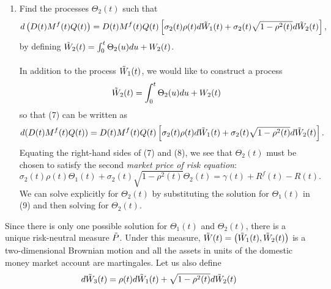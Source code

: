 \documentclass[11pt,a4,table]{article}
\begin{document}
\begin{enumerate}
\begin{enumerate}
        \item Find the processes $\Theta_2(t)$ such that
        \begin{equation*}
            d\left(D(t)M^f(t)Q(t)\right) = D(t)M^f(t)Q(t) \left[\sigma_2(t)\rho(t) d\Tilde{W}_1(t) + \sigma_2(t)\sqrt{1-\rho^2(t)} d\Tilde{W}_2(t)\right],
        \end{equation*}
        by defining $\Tilde{W}_2(t) = \int_0^t \Theta_2(u) du + W_2(t)$.\\\\
        In addition to the process $\Tilde{W}_1(t)$, we would like to construct a process
        \begin{equation*}
            \Tilde{W}_2(t) = \int_0^t \Theta_2(u) du + W_2(t)
        \end{equation*}
        so that (7) can be written as
        \begin{equation}
            d(D(t)M^f(t)Q(t)) = D(t)M^f(t)Q(t)\left[\sigma_2(t)\rho(t) d\Tilde{W}_1(t) + \sigma_2(t)\sqrt{1-\rho^2(t)} d\Tilde{W}_2(t)\right].
        \end{equation}
        Equating the right-hand sides of (7) and (8), we see that $\Theta_2(t)$ must be chosen to satisfy the second \textit{market price of risk equation}:
        \begin{equation}
            \sigma_2(t)\rho(t)\Theta_1(t) + \sigma_2(t)\sqrt{1-\rho^2(t)}\Theta_2(t) = \gamma(t) + R^f(t) - R(t).
        \end{equation}
        We can solve explicitly for $\Theta_2(t)$ by substituting the solution for $\Theta_1(t)$ in (9) and then solving for $\Theta_2(t)$.
    \end{enumerate}
    
    
    Since there is only one possible solution for $\Theta_1(t)$ and $\Theta_2(t)$, there is a unique risk-neutral measure $\Tilde{P}$. Under this measure, $\Tilde{W}(t)=\left(\Tilde{W}_1(t),\Tilde{W}_2(t)\right)$ is a two-dimensional Brownian motion and all the assets in units of the domestic money market account are martingales. Let us also define
    \begin{equation*}
        d\Tilde{W}_3(t)=\rho(t) d\Tilde{W}_1(t) + \sqrt{1-\rho^2(t)} d\Tilde{W}_2(t)
    \end{equation*}
    
    \begin{enumerate}
        \setcounter{enumii}{4}
    

\end{enumerate}
\end{enumerate}
\end{document}
